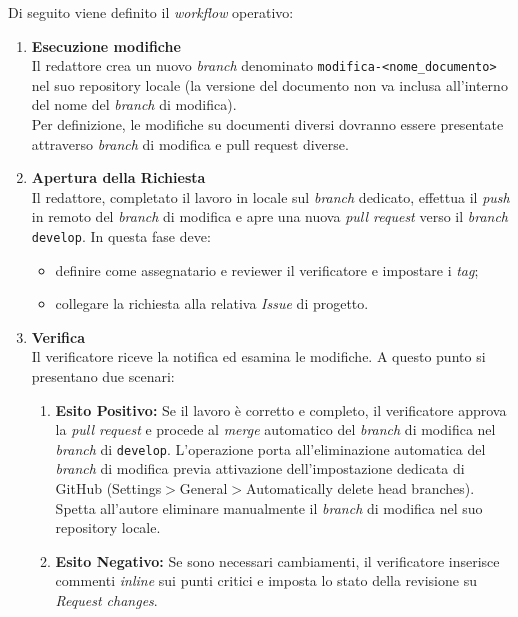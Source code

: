 \documentclass[10pt, letterpaper]{article}
\begin{document}
Di seguito viene definito il \textit{workflow} operativo:

\begin{enumerate}
    \item \textbf{Esecuzione modifiche} \\
          Il redattore crea un nuovo \textit{branch} denominato \texttt{modifica-<nome\_documento>} nel suo repository locale (la versione del documento non va inclusa all'interno del nome del \textit{branch} di modifica).\\
          Per definizione, le modifiche su documenti diversi dovranno essere presentate attraverso \textit{branch} di modifica e pull request diverse.

    \item \textbf{Apertura della Richiesta} \\
          Il redattore, completato il lavoro in locale sul \textit{branch} dedicato, effettua il \textit{push} in remoto del \textit{branch} di modifica e apre una nuova \textit{pull request}
          verso il \textit{branch} \texttt{develop}. In questa fase deve:
          \begin{itemize}
              \item definire come assegnatario e reviewer il verificatore e impostare i \textit{tag};
              \item collegare la richiesta alla relativa \textit{Issue} di progetto.
          \end{itemize}

    \item \textbf{Verifica} \\
          Il verificatore riceve la notifica ed esamina le modifiche. A questo punto si presentano due scenari:
          \begin{enumerate}
              \item \textbf{Esito Positivo:} Se il lavoro è corretto e completo, il verificatore approva la \textit{pull request}
                    e procede al \textit{merge} automatico del \textit{branch} di modifica nel \textit{branch} di \texttt{develop}. L'operazione porta all'eliminazione
                    automatica del \textit{branch} di modifica previa attivazione dell'impostazione dedicata di GitHub (Settings$>$General$>$Automatically delete head branches).\\
                    Spetta all'autore eliminare manualmente il \textit{branch} di modifica nel suo repository locale.
              \item \textbf{Esito Negativo:} Se sono necessari cambiamenti, il verificatore inserisce commenti \textit{inline}
                    sui punti critici e imposta lo stato della revisione su \textit{Request changes}.\\
          \end{enumerate}


\end{enumerate}
\end{document}
